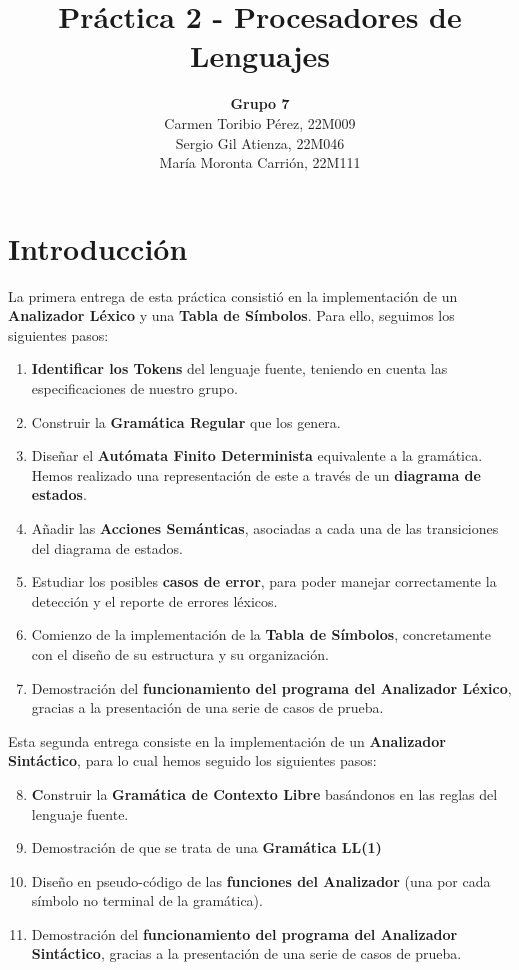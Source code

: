\documentclass{article}
\title{\textbf{Práctica 2 - Procesadores de Lenguajes}}
\author{\textbf{Grupo 7}\\Carmen Toribio Pérez, 22M009\\Sergio Gil Atienza, 22M046\\María Moronta Carrión, 22M111}
\date{}
\begin{document}
\maketitle

\section*{Introducción}

La primera entrega de esta práctica consistió en la implementación de un \textbf{Analizador Léxico} y una \textbf{Tabla de Símbolos}. Para ello, seguimos los siguientes pasos: 
\begin{enumerate}
    \item \textbf{Identificar los Tokens} del lenguaje fuente, teniendo en cuenta las especificaciones de nuestro grupo.
    \item Construir la \textbf{Gramática Regular} que los genera.
    \item Diseñar el \textbf{Autómata Finito Determinista} equivalente a la gramática. Hemos realizado una representación de este a través de un \textbf{diagrama de estados}.
    \item Añadir las \textbf{Acciones Semánticas}, asociadas a cada una de las transiciones del diagrama de estados.
    \item Estudiar los posibles \textbf{casos de error}, para poder manejar correctamente la detección y el reporte de errores léxicos. 
    \item Comienzo de la implementación de la \textbf{Tabla de Símbolos}, concretamente con el diseño de su estructura y su organización.
    \item Demostración del \textbf{funcionamiento del programa del Analizador Léxico}, gracias a la presentación de una serie de casos de prueba.
\end{enumerate}
 
Esta segunda entrega consiste en la implementación de un \textbf{Analizador Sintáctico}, para lo cual hemos seguido los siguientes pasos:

\begin{enumerate}
    \setcounter{enumi}{7}
    \item \textbf Construir la \textbf{Gramática de Contexto Libre} basándonos en las reglas del lenguaje fuente.
    \item Demostración de que se trata de una \textbf{Gramática LL(1)}
    \item Diseño en pseudo-código de las \textbf{funciones del Analizador} (una por cada símbolo no terminal de la gramática).
    \item Demostración del \textbf{funcionamiento del programa del Analizador Sintáctico}, gracias a la presentación de una serie de casos de prueba.
\end{enumerate}
\end{document}
